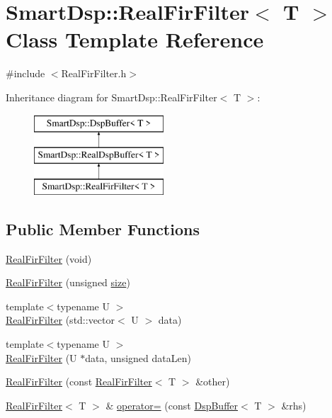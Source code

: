 \hypertarget{class_smart_dsp_1_1_real_fir_filter}{\section{Smart\+Dsp\+:\+:Real\+Fir\+Filter$<$ T $>$ Class Template Reference}
\label{class_smart_dsp_1_1_real_fir_filter}
}


{\ttfamily \#include $<$Real\+Fir\+Filter.\+h$>$}

Inheritance diagram for Smart\+Dsp\+:\+:Real\+Fir\+Filter$<$ T $>$\+:\begin{figure}[H]
\begin{center}
\leavevmode
\includegraphics[height=3.000000cm]{class_smart_dsp_1_1_real_fir_filter}
\end{center}
\end{figure}
\subsection*{Public Member Functions}
\begin{DoxyCompactItemize}
\item 
\hyperlink{class_smart_dsp_1_1_real_fir_filter_afdef048d38c7f0c9ec3115f762066a72}{Real\+Fir\+Filter} (void)
\item 
\hyperlink{class_smart_dsp_1_1_real_fir_filter_a202a3515ae141bbf348bdc2c791c77ce}{Real\+Fir\+Filter} (unsigned \hyperlink{class_smart_dsp_1_1_dsp_buffer_af931c57c26c1f459cae47ca4b249d402}{size})
\item 
{\footnotesize template$<$typename U $>$ }\\\hyperlink{class_smart_dsp_1_1_real_fir_filter_a0be3bd0f15b082e2642dfe926844dc4c}{Real\+Fir\+Filter} (std\+::vector$<$ U $>$ data)
\item 
{\footnotesize template$<$typename U $>$ }\\\hyperlink{class_smart_dsp_1_1_real_fir_filter_af3f8b7baea3a554e92e4f2e851813e2b}{Real\+Fir\+Filter} (U $\ast$data, unsigned data\+Len)
\item 
\hyperlink{class_smart_dsp_1_1_real_fir_filter_a50fc0d776c2e76be49c389fe109baf84}{Real\+Fir\+Filter} (const \hyperlink{class_smart_dsp_1_1_real_fir_filter}{Real\+Fir\+Filter}$<$ T $>$ \&other)
\item 
\hyperlink{class_smart_dsp_1_1_real_fir_filter}{Real\+Fir\+Filter}$<$ T $>$ \& \hyperlink{class_smart_dsp_1_1_real_fir_filter_a79d51fc39a0fcd5ad8551e51976000b9}{operator=} (const \hyperlink{class_smart_dsp_1_1_dsp_buffer}{Dsp\+Buffer}$<$ T $>$ \&rhs)
\end{DoxyCompactItemize}
